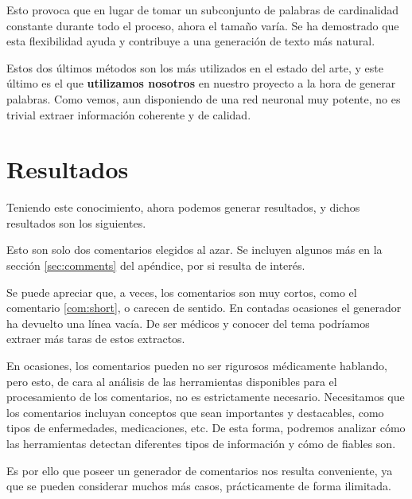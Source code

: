 Esto provoca que en lugar de tomar un subconjunto de palabras de cardinalidad constante durante todo el proceso, ahora el tamaño varía. Se ha demostrado que esta flexibilidad ayuda y contribuye a una generación de texto más natural.

Estos dos últimos métodos son los más utilizados en el estado del arte, y este último es el que \textbf{utilizamos nosotros} en nuestro proyecto a la hora de generar palabras. Como vemos, aun disponiendo de una red neuronal muy potente, no es trivial extraer información coherente y de calidad.



\section{Resultados}
Teniendo este conocimiento, ahora podemos generar resultados, y dichos resultados son los siguientes.

\begin{thm}
\end{thm}
\begin{thm}
\end{thm}

Esto son solo dos comentarios elegidos al azar. Se incluyen algunos más en la sección \ref{sec:comments} del apéndice, por si resulta de interés.

Se puede apreciar que, a veces, los comentarios son muy cortos, como el comentario \ref{com:short}, o carecen de sentido. En contadas ocasiones el generador ha devuelto una línea vacía. De ser médicos y conocer del tema podríamos extraer más taras de estos extractos. 

En ocasiones, los comentarios pueden no ser rigurosos médicamente hablando, pero esto, de cara al análisis de las herramientas disponibles para el procesamiento de los comentarios, no es estrictamente necesario. Necesitamos que los comentarios incluyan conceptos que sean importantes y destacables, como tipos de enfermedades, medicaciones, etc. De esta forma, podremos analizar cómo las herramientas detectan diferentes tipos de información y cómo de fiables son. 

Es por ello que poseer un generador de comentarios nos resulta conveniente, ya que se pueden considerar muchos más casos, prácticamente de forma ilimitada.